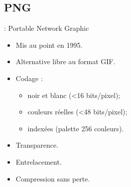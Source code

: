 \documentclass[14pt]{beamer}
\begin{document}
\subsection{PNG}
\begin{frame}{\subsecname : Portable Network Graphic}
    \begin{itemize}
    \item Mis au point en 1995.
    \item Alternative libre au format GIF.
    \item Codage :
    \begin{itemize}
        \item noir et blanc (<16 bits/pixel);
        \item couleurs réelles (<48 bits/pixel);
        \item indexées (palette 256 couleurs).
    \end{itemize}
    \item Transparence.
    \item Entrelacement.
    \item Compression sans perte.
    \end{itemize}


    
\end{frame}



\end{document}
